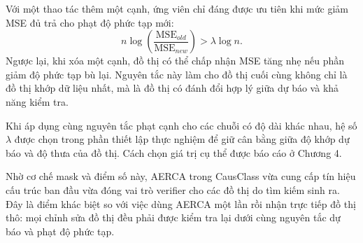 Với một thao tác thêm một cạnh, ứng viên chỉ đáng được ưu tiên khi mức giảm MSE đủ trả cho phạt độ phức tạp mới:
\begin{equation}
\label{eq:bic-improvement}
    n\log\left(\frac{\mathrm{MSE}_{old}}{\mathrm{MSE}_{new}}\right)>\lambda\log n.
\end{equation}
Ngược lại, khi xóa một cạnh, đồ thị có thể chấp nhận MSE tăng nhẹ nếu phần giảm độ phức tạp bù lại. Nguyên tắc này làm cho đồ thị cuối cùng không chỉ là đồ thị khớp dữ liệu nhất, mà là đồ thị có đánh đổi hợp lý giữa dự báo và khả năng kiểm tra.

Khi áp dụng cùng nguyên tắc phạt cạnh cho các chuỗi có độ dài khác nhau, hệ số \(\lambda\) được chọn trong phần thiết lập thực nghiệm để giữ cân bằng giữa độ khớp dự báo và độ thưa của đồ thị. Cách chọn giá trị cụ thể được báo cáo ở Chương 4.

Nhờ cơ chế mask và điểm số này, AERCA trong CausClass vừa cung cấp tín hiệu cấu trúc ban đầu vừa đóng vai trò verifier cho các đồ thị do tìm kiếm sinh ra. Đây là điểm khác biệt so với việc dùng AERCA một lần rồi nhận trực tiếp đồ thị thô: mọi chỉnh sửa đồ thị đều phải được kiểm tra lại dưới cùng nguyên tắc dự báo và phạt độ phức tạp.